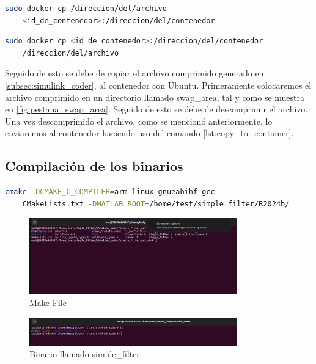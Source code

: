 \begin{lstlisting}[language=bash, caption={Copiar archivos al contenedor, Linux}, label=lst:copy_to_container]
    sudo docker cp /direccion/del/archivo 
    <id_de_contenedor>:/direccion/del/contenedor
\end{lstlisting}

\begin{lstlisting}[language=bash, caption={Copiar archivos del contenedor, Linux}, label=lst:copy_from_container]
    sudo docker cp <id_de_contenedor>:/direccion/del/contenedor
    /direccion/del/archivo
\end{lstlisting}

Seguido de esto se debe de copiar el archivo comprimido generado en \ref{subsec:simulink_coder}, al contenedor con Ubuntu. Primeramente colocaremos el archivo comprimido en un directorio llamado swap\_area, tal y como se muestra en \ref{fig:pestana_swap_area}. Seguido de esto se debe de descomprimir el archivo. Una vez descomprimido el archivo, como se mencionó anteriormente, lo enviaremos al contenedor haciendo uso del comando \ref{lst:copy_to_container}.

\subsection{Compilación de los binarios}\label{subsec:compilacion_binario}

\begin{lstlisting}[language=bash, caption={Compilacion del programa, Linux}, label=lst:build_cmake_file]
    cmake -DCMAKE_C_COMPILER=arm-linux-gnueabihf-gcc 
    CMakeLists.txt -DMATLAB_ROOT=/home/test/simple_filter/R2024b/
\end{lstlisting}

\begin{figure}[h!]
    \centering
    \includegraphics[width=0.8\textwidth]{fig/especifico_2/paso_a_paso_mtmt/cmake_file.png}
    \caption{Make File}
    \label{fig:make_file}
\end{figure}


\begin{figure}[h!]
    \centering
    \includegraphics[width=0.8\textwidth]{fig/especifico_2/paso_a_paso_mtmt/binario_compilado.png}
    \caption{Binario llamado simple\_filter}
    \label{fig:binario_compilado}
\end{figure}

